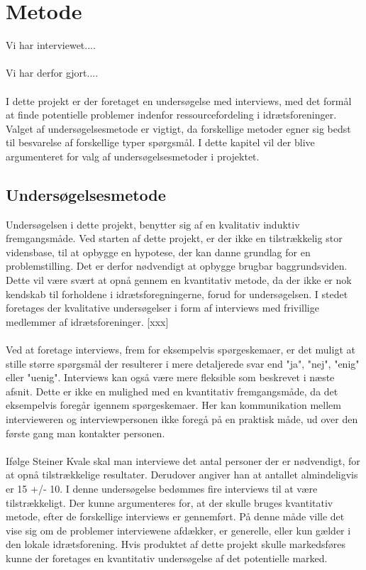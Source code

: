 \chapter{Metode}\label{ch:ch2label}
Vi har interviewet....
\\
\\
Vi har derfor gjort....
\\
\\
I dette projekt er der foretaget en undersøgelse med interviews, med det formål at finde potentielle problemer indenfor ressourcefordeling i idrætsforeninger. Valget af undersøgelsesmetode er vigtigt, da forskellige metoder egner sig bedst til besvarelse af forskellige typer spørgsmål. I dette kapitel vil der blive argumenteret for valg af undersøgelsesmetoder i projektet.


\section{Undersøgelsesmetode}
Undersøgelsen i dette projekt, benytter sig af en kvalitativ induktiv fremgangsmåde. 
Ved starten af dette projekt, er der ikke en tilstrækkelig stor vidensbase, til at opbygge en hypotese, der kan danne grundlag for en problemstilling. Det er derfor nødvendigt at opbygge brugbar baggrundsviden. Dette vil være svært at opnå gennem en kvantitativ metode, da der ikke er nok kendskab til forholdene i idrætsforegningerne, forud for undersøgelsen. I stedet foretages der kvalitative undersøgelser i form af interviews med frivillige medlemmer af idrætsforeninger. [xxx]
\\
\\
Ved at foretage interviews, frem for eksempelvis spørgeskemaer, er det muligt at stille større spørgsmål der resulterer i mere detaljerede svar end "ja", "nej", "enig" eller "uenig". Interviews kan også være mere fleksible som beskrevet i næste afsnit. Dette er ikke en mulighed med en kvantitativ fremgangsmåde, da det eksempelvis foregår igennem spørgeskemaer. Her kan kommunikation mellem intervieweren og interviewpersonen ikke foregå på en praktisk måde, ud over den første gang man kontakter personen. \citep{kvale2015}
\\
\\
Ifølge Steiner Kvale skal man interviewe det antal personer der er nødvendigt, for at opnå tilstrækkelige resultater. Derudover angiver han at antallet almindeligvis er 15 +/- 10. \cite{kvale2015} I denne undersøgelse bedømmes fire interviews til at være tilstrækkeligt. 
Der kunne argumenteres for, at der skulle bruges kvantitativ metode, efter de forskellige interviews er gennemført. På denne måde ville det vise sig om de problemer interviewene afdækker, er generelle, eller kun gælder i den lokale idrætsforening. Hvis produktet af dette projekt skulle markedsføres kunne der foretages en kvantitativ undersøgelse af det potentielle marked. 
